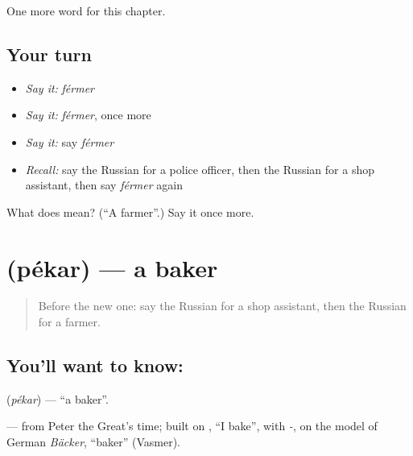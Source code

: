 \begin{grammarlens}[title={What you've built}]
One more word for this chapter.
\end{grammarlens}

\subsection*{Your turn}
\begin{itemize}
\raggedright
  \item \emph{Say it:} \emph{férmer}
  \item \emph{Say it:} \emph{férmer}, once more
  \item \emph{Say it:} say \emph{férmer}
  \item \emph{Recall:} say the Russian for a police officer, then the Russian for a shop assistant, then say \emph{férmer} again
\end{itemize}

\begin{tcolorbox}[breakable,colback=teal!4,colframe=teal!35!black,title={Before you move on}]
What does  mean? (\textquotedblleft{}A farmer\textquotedblright{}.) Say it once more.
\end{tcolorbox}
\section[\texorpdfstring{\ru{пекарь} (pékar)}{пекарь (pékar)}]{ (pékar) — a baker}

\label{lesson:RU-C108-baker}



\begin{quote}
Before the new one: say the Russian for a shop assistant, then the Russian for a farmer.
\end{quote}

\subsection*{You'll want to know: }
\textbf{} (\emph{pékar}) — \textquotedblleft{}a baker\textquotedblright{}.

\begin{cousinweb}
\textbf{} — from Peter the Great's time; built on \emph{}, \textquotedblleft{}I bake\textquotedblright{}, with \emph{-}, on the model of German \emph{Bäcker}, \textquotedblleft{}baker\textquotedblright{} (Vasmer).
\end{cousinweb}

